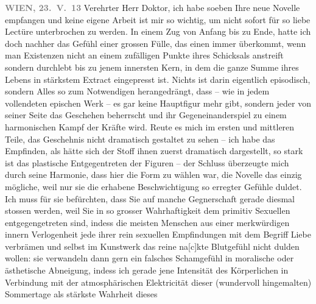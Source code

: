 \pstart
           \raggedleft{}\textcolor{gray}{\textbf{WIEN,{ }23. V. 13}}\pend
           \vspace{0.5em}
\pstart
           Verehrter Herr Doktor, ich habe soeben Ihre neue Novelle empfangen und keine eigene Arbeit
               ist mir so wichtig, um nicht sofort für so liebe Lectüre unterbrochen zu werden. In
               einem Zug von Anfang bis zu Ende, hatte ich doch nachher das Gefühl einer grossen
               Fülle, das einen immer überkommt, wenn man Existenzen nicht an einem zufälligen
               Punkte ihres Schicksals anstreift sondern durchlebt bis zu jenem innersten Kern, in
               dem die ganze Summe ihres Lebens in stärkstem Extract eingepresst ist. Nichts ist
               darin eigentlich episodisch, sondern Alles so zum {\pb}Notwendigen herangedrängt, dass – wie in
               jedem vollendeten epischen Werk – es gar keine Hauptfigur mehr gibt, sondern jeder
               von seiner Seite das Geschehen beherrscht und ihr Gegeneinanderspiel zu einem
               harmonischen Kampf der Kräfte wird. Reute es mich im ersten und mittleren Teile, das
               Geschehnis nicht dramatisch gestaltet zu sehen – ich habe das Empfinden, als hätte
               sich der Stoff ihnen zuerst dramatisch dargestellt, so stark ist das  plastische Entgegentreten der Figuren – der
               Schluss überzeugte mich durch seine Harmonie, dass hier die Form zu wählen war, die
               Novelle das einzig mögliche, weil nur sie die erhabene Beschwichtigung so erregter
               Gefühle duldet. Ich muss für sie befürchten, dass Sie auf manche Gegnerschaft gera{\pb}de diesmal stossen werden, weil Sie in
               so grosser Wahrhaftigkeit dem primitiv Sexuellen entgegengetreten sind, indess die
               meisten Menschen aus einer merkwürdigen innern Verlogenheit jede ihrer rein sexuellen
               Empfindungen mit dem Begriff Liebe verbrämen und 
               selbst im Kunstwerk das reine na{[}c{]}kte Blutgefühl nicht dulden wollen: sie verwandeln
               dann gern ein falsches Schamgefühl in moralische oder ästhetische Abneigung, indess
               ich gerade jene Intensität des Körperlichen in Verbindung mit der atmosphärischen
               Elektricität dieser (wundervoll hingemalten) Sommertage als stärkste Wahrheit dieses
